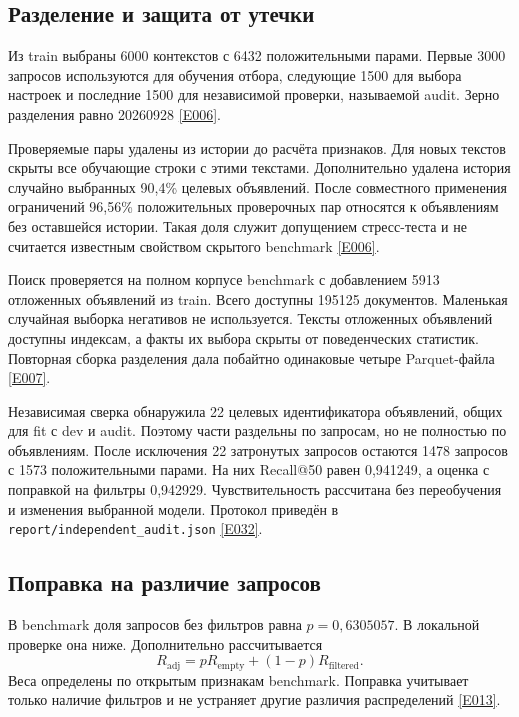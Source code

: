 \documentclass{article}
\newcommand{\ev}[1]{\href{https://github.com/revefffect/avito-contest/blob/main/evidence/INDEX.md\#E#1}{[E#1]}}
\newcommand{\file}[1]{\texttt{\small #1}}
\begin{document}
\subsection{Разделение и защита от утечки}

Из train выбраны 6000 контекстов с 6432 положительными парами. Первые 3000 запросов используются для обучения отбора, следующие 1500 для выбора настроек и последние 1500 для независимой проверки, называемой audit. Зерно разделения равно 20260928 \ev{006}.

Проверяемые пары удалены из истории до расчёта признаков. Для новых текстов скрыты все обучающие строки с этими текстами. Дополнительно удалена история случайно выбранных 90{,}4\% целевых объявлений. После совместного применения ограничений 96{,}56\% положительных проверочных пар относятся к объявлениям без оставшейся истории. Такая доля служит допущением стресс-теста и не считается известным свойством скрытого benchmark \ev{006}.

Поиск проверяется на полном корпусе benchmark с добавлением 5913 отложенных объявлений из train. Всего доступны 195125 документов. Маленькая случайная выборка негативов не используется. Тексты отложенных объявлений доступны индексам, а факты их выбора скрыты от поведенческих статистик. Повторная сборка разделения дала побайтно одинаковые четыре Parquet-файла \ev{007}.

Независимая сверка обнаружила 22 целевых идентификатора объявлений, общих для fit с dev и audit. Поэтому части раздельны по запросам, но не полностью по объявлениям. После исключения 22 затронутых запросов остаются 1478 запросов с 1573 положительными парами. На них Recall@50 равен 0{,}941249, а оценка с поправкой на фильтры 0{,}942929. Чувствительность рассчитана без переобучения и изменения выбранной модели. Протокол приведён в \file{report/independent\_audit.json} \ev{032}.

\subsection{Поправка на различие запросов}

В benchmark доля запросов без фильтров равна $p=0{,}6305057$. В локальной проверке она ниже. Дополнительно рассчитывается
\begin{equation}
R_{\mathrm{adj}}=pR_{\mathrm{empty}}+(1-p)R_{\mathrm{filtered}}.
\end{equation}
Веса определены по открытым признакам benchmark. Поправка учитывает только наличие фильтров и не устраняет другие различия распределений \ev{013}.
\end{document}
